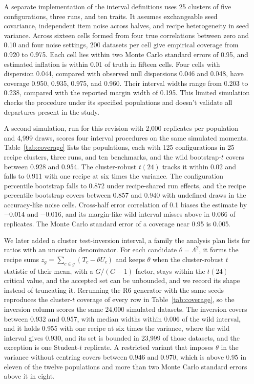 A separate implementation of the interval definitions uses 25 clusters of five configurations, three runs, and ten traits. It assumes exchangeable seed covariance, independent item noise across halves, and recipe heterogeneity in seed variance. Across sixteen cells formed from four true correlations between zero and 0.10 and four noise settings, 200 datasets per cell give empirical coverage from 0.920 to 0.975. Each cell lies within two Monte Carlo standard errors of 0.95, and estimated inflation is within 0.01 of truth in fifteen cells. Four cells with dispersion 0.044, compared with observed null dispersions 0.046 and 0.048, have coverage 0.950, 0.935, 0.975, and 0.960. Their interval widths range from 0.203 to 0.238, compared with the reported margin width of 0.195. This limited simulation checks the procedure under its specified populations and doesn't validate all departures present in the study.

A second simulation, run for this revision with 2,000 replicates per population and 4,999 draws, scores four interval procedures on the same simulated moments. Table~\ref{tab:coverage} lists the populations, each with 125 configurations in 25 recipe clusters, three runs, and ten benchmarks, and the wild bootstrap-$t$ covers between 0.928 and 0.954. The cluster-robust $t(24)$ tracks it within 0.02 and falls to 0.911 with one recipe at six times the variance. The configuration percentile bootstrap falls to 0.872 under recipe-shared run effects, and the recipe percentile bootstrap covers between 0.857 and 0.940 with undefined draws in the accuracy-like noise cells. Cross-half error correlation of 0.1 biases the estimate by $-0.014$ and $-0.016$, and its margin-like wild interval misses above in 0.066 of replicates. The Monte Carlo standard error of a coverage near 0.95 is 0.005.

We later added a cluster test-inversion interval, a family the analysis plan lists for ratios with an uncertain denominator. For each candidate $\theta=\Lambda^2$, it forms the recipe sums $z_g=\sum_{c\in g}(T_c-\theta U_c)$ and keeps $\theta$ when the cluster-robust $t$ statistic of their mean, with a $G/(G-1)$ factor, stays within the $t(24)$ critical value, and the accepted set can be unbounded, and we record its shape instead of truncating it. Rerunning the R6 generator with the same seeds reproduces the cluster-$t$ coverage of every row in Table~\ref{tab:coverage}, so the inversion column scores the same 24,000 simulated datasets. The inversion covers between 0.932 and 0.957, with median widths within 0.006 of the wild interval, and it holds 0.955 with one recipe at six times the variance, where the wild interval gives 0.930, and its set is bounded in 23,999 of those datasets, and the exception is one Student-$t$ replicate. A restricted variant that imposes $\theta$ in the variance without centring covers between 0.946 and 0.970, which is above 0.95 in eleven of the twelve populations and more than two Monte Carlo standard errors above it in eight.

